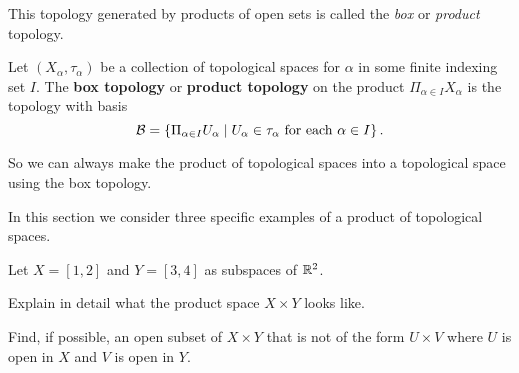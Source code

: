 This topology generated by products of open sets is called the \emph{box} or \emph{product} topology.

\begin{definition} \label{def:box_topology} Let $(X_{\alpha}, \tau_{\alpha})$ be a collection of topological spaces for $\alpha$ in some finite indexing set $I$. The \textbf{box topology} or \textbf{product topology} on the product $\Pi_{\alpha \in I} X_{\alpha}$ is the topology with basis
\[\mathcal{B} = \left\{ \Pi_{\alpha \in I} U_{\alpha} \mid U_{\alpha} \in \tau_{\alpha}  \text{ for each } \alpha \in I \right\}.\]
\end{definition}

So we can always make the product of topological spaces into a topological space using the box topology. 


In this section we consider three specific examples of a product of topological spaces. 

\begin{activity} Let $X = [1,2]$ and $Y = [3,4]$ as subspaces of $\mathbb{R}^2$. 
\ba
\item Explain in detail what the product space $X \times Y$ looks like. 

\item Find, if possible, an open subset of $X \times Y$ that is not of the form $U \times V$ where $U$ is open in $X$ and $V$ is open in $Y$.

\ea

\end{activity}

\begin{comment}

\ActivitySolution

\ba
\item The product space $X \times Y$ contains all points of the form $(x,y)$ with $1 \leq x \leq 2$ and $3 \leq y \leq 4$ in $\R^2$. This set of points is the rectangle in $\R^2$ with vertices $(1,3)$, $(2,3)$, $(1,4)$ and $(2,4)$. 

\item The set $O = \{(x,y) \mid 1.1 < x < 1.3, 3.1 < y < 3.3\} \cup \{(x,y) \mid 1.7< x < 1.9, 3.7 < y < 3.9\}$ is equal to $(B(1.2,0.1) \times B(3.2,0.1)) \cup ((B(1.8,0.1) \times B(3.8,0.1))$ and so is open in $X \times Y$. However, $O$ is not of the form $U \times V$ where $U$ is open in $X$ and $V$ is open in $Y$. To see why, suppose to the contrary that $O = U \times V$ for some $U$ open in $X$ and $V$ open in $Y$. Since the points $(x,y)$ in $O$ only have $x \in (1.1,1.3) \cup (1.7,1.9)$ and $y \in (3.1,3.3) \cup (3.7,3.9)$, it follows that $U = (1,1,1.3) \cup (1.7,1.9)$ and $V = (3.1,3.3) \cup (3.7,3.9)$. But then $(1.8, 3.2)$ is in $U \times V$. Since $(1.8, 3.2)$ is not in $O$, we conclude that $O$ is not of the for $U \times V$ with $U$ open in $X$ and $V$ open in $Y$.  

\ea


\end{comment}


